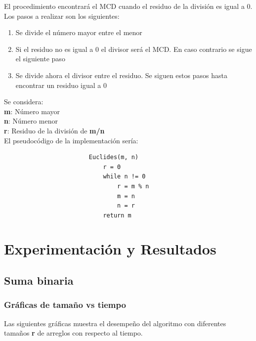 \documentclass{report}
\begin{document}
                El procedimiento encontrará el MCD cuando el residuo de la división es igual a 0. Los pasos a realizar son los siguientes:
                
                \begin{enumerate}
                    \item Se divide el número mayor entre el menor
                    \item Si el residuo no es igual a 0 el divisor será el MCD. En caso contrario se sigue el siguiente paso
                    \item Se divide ahora el divisor entre el residuo. Se siguen estos pasos hasta encontrar un residuo igual a 0
                \end{enumerate} 
                
                \hfill \break
                
                Se considera:\\
                \textbf{m}: Número mayor\\
                \textbf{n}: Número menor\\
                \textbf{r}: Residuo de la división de \textbf{m/n}\\
                
                El pseudoc\'odigo de la implementación sería:
                    
                    \begin{verbatim}
                        Euclides(m, n)
                            r = 0
                            while n != 0
                                r = m % n
                                m = n
                                n = r
                            return m
                        \end{verbatim}
    
\section*{Experimentación y Resultados}
    \subsection*{Suma binaria}
        \subsubsection*{Gráficas de tamaño vs tiempo}
            Las siguientes gráficas muestra el desempeño del algoritmo con diferentes tamaños \textbf{r} de arreglos con respecto al tiempo.\\
            
\end{document}
